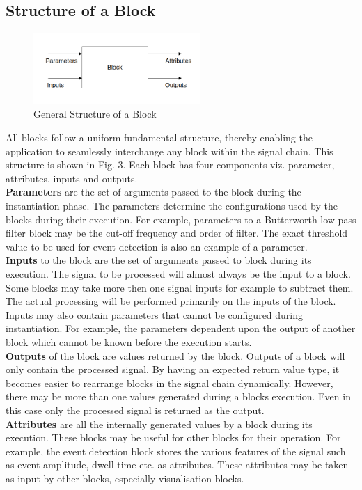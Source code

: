 \documentclass[journal]{IEEEtran}
\begin{document}
\subsection{Structure of a Block}


\begin{figure}[!t]
\centering
\includegraphics[width=2.5in]{Block.png}
\caption{General Structure of a Block}
\label{fig_3}
\end{figure}

All blocks follow a uniform fundamental structure, thereby enabling the application to seamlessly interchange any block within the signal chain. This structure is shown in Fig. 3. Each block has four components viz. parameter, attributes, inputs and outputs. \\
{\bf{Parameters}} are the set of arguments passed to the block during the instantiation phase. The parameters determine the configurations used by the blocks during their execution. For example, parameters to a Butterworth low pass filter block may be the cut-off frequency and order of filter. The exact threshold value to be used for event detection is also an example of a parameter. \\
{\bf{Inputs}} to the block are the set of arguments passed to block during its execution. The signal to be processed will almost always be the input to a block. Some blocks may take more then one signal inputs for example to subtract them. The actual processing will be performed primarily on the inputs of the block. Inputs may also contain parameters that cannot be configured during instantiation. For example, the parameters dependent upon the output of another block which cannot be known before the execution starts. \\
{\bf{Outputs}} of the block are values returned by the block. Outputs of a block will only contain the processed signal. By having an expected return value type, it becomes easier to rearrange blocks in the signal chain dynamically. However, there may be more than one values generated during a blocks execution. Even in this case only the processed signal is returned as the output. \\
{\bf{Attributes}} are all the internally generated values by a block during its execution. These blocks may be useful for other blocks for their operation. For example, the event detection block stores the various features of the signal such as event amplitude, dwell time etc. as attributes. These attributes may be taken as input by other blocks, especially visualisation blocks.
\end{document}

